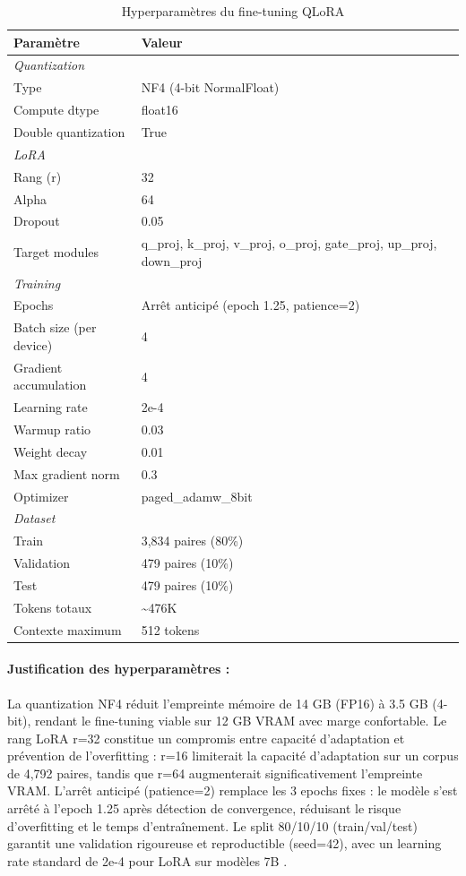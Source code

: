 \begin{table}[H]
\centering
\caption{Hyperparamètres du fine-tuning QLoRA}
\label{tab:hyperparams_qlora}
\begin{tabular}{@{}ll@{}}
\toprule
\textbf{Paramètre} & \textbf{Valeur} \\ \midrule
\multicolumn{2}{l}{\textit{Quantization}} \\
\quad Type & NF4 (4-bit NormalFloat) \\
\quad Compute dtype & float16 \\
\quad Double quantization & True \\
\midrule
\multicolumn{2}{l}{\textit{LoRA}} \\
\quad Rang (r) & 32 \\
\quad Alpha & 64 \\
\quad Dropout & 0.05 \\
\quad Target modules & q\_proj, k\_proj, v\_proj, o\_proj, gate\_proj, up\_proj, down\_proj \\
\midrule
\multicolumn{2}{l}{\textit{Training}} \\
\quad Epochs & Arrêt anticipé (epoch 1.25, patience=2) \\
\quad Batch size (per device) & 4 \\
\quad Gradient accumulation & 4 \\
\quad Learning rate & 2e-4 \\
\quad Warmup ratio & 0.03 \\
\quad Weight decay & 0.01 \\
\quad Max gradient norm & 0.3 \\
\quad Optimizer & paged\_adamw\_8bit \\
\midrule
\multicolumn{2}{l}{\textit{Dataset}} \\
\quad Train & 3,834 paires (80\%) \\
\quad Validation & 479 paires (10\%) \\
\quad Test & 479 paires (10\%) \\
\quad Tokens totaux & \textasciitilde{}476K \\
\quad Contexte maximum & 512 tokens \\
\bottomrule
\end{tabular}
\end{table}

\paragraph{Justification des hyperparamètres :}
La quantization NF4 réduit l'empreinte mémoire de 14 GB (FP16) à 3.5 GB (4-bit), rendant le fine-tuning viable sur 12 GB VRAM avec marge confortable. Le rang LoRA r=32 constitue un compromis entre capacité d'adaptation et prévention de l'overfitting : r=16 limiterait la capacité d'adaptation sur un corpus de 4,792 paires, tandis que r=64 augmenterait significativement l'empreinte VRAM. L'arrêt anticipé (patience=2) remplace les 3 epochs fixes : le modèle s'est arrêté à l'epoch 1.25 après détection de convergence, réduisant le risque d'overfitting et le temps d'entraînement. Le split 80/10/10 (train/val/test) garantit une validation rigoureuse et reproductible (seed=42), avec un learning rate standard de 2e-4 pour LoRA sur modèles 7B \citep{hu2021lora}.

